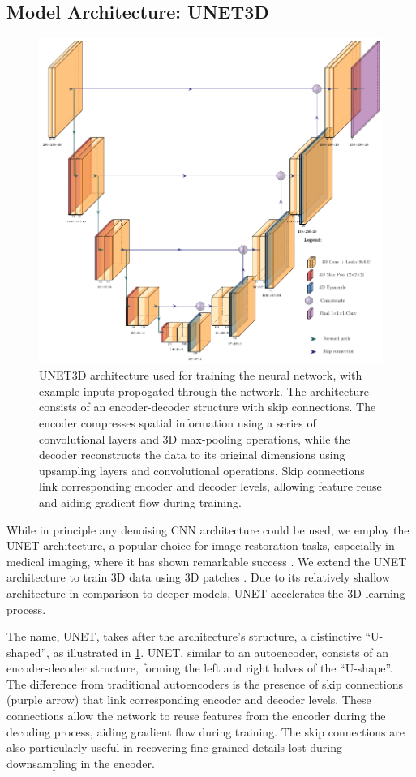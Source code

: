\subsection{Model Architecture: UNET3D}
\begin{figure}
    \centering
    \includegraphics[width=0.8\linewidth]{images/unet_architecture.pdf}
    \caption{UNET3D architecture used for training the neural network, with example inputs propogated through the network. The architecture consists of an encoder-decoder structure with skip connections. The encoder compresses spatial information using a series of convolutional layers and 3D max-pooling operations, while the decoder reconstructs the data to its original dimensions using upsampling layers and convolutional operations. Skip connections link corresponding encoder and decoder levels, allowing feature reuse and aiding gradient flow during training.}
    \label{fig:unet-architecture}
\end{figure}

While in principle any denoising \gls{CNN} architecture could be used, we employ the UNET architecture, a popular choice for image restoration tasks, especially in medical imaging, where it has shown remarkable success \cite{ronnebergerUNetConvolutionalNetworks}. We extend the UNET architecture to train 3D data using 3D patches \cite{cicek3DUNetLearning2016}. Due to its relatively shallow architecture in comparison to deeper models, UNET accelerates the 3D learning process.

The name, UNET, takes after the architecture’s structure, a distinctive “U-shaped”, as illustrated in \cref{fig:unet-architecture}. UNET, similar to an autoencoder, consists of an encoder-decoder structure, forming the left and right halves of the “U-shape”. The difference from traditional autoencoders is the presence of skip connections (purple arrow) that link corresponding encoder and decoder levels. These connections allow the network to reuse features from the encoder during the decoding process, aiding gradient flow during training. The skip connections are also particularly useful in recovering fine-grained details lost during downsampling in the encoder.

